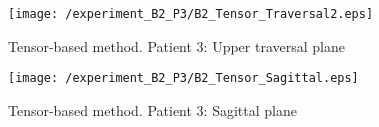 \begin{figure}[H]
  \centering
  \texttt{[image: /experiment\_B2\_P3/B2\_Tensor\_Traversal2.eps]}
  \caption{Tensor-based method. Patient 3: Upper traversal plane}
  \label{B2_TTraversal2}
\end{figure}

\begin{figure}[H]
  \centering
  \texttt{[image: /experiment\_B2\_P3/B2\_Tensor\_Sagittal.eps]}
  \caption{Tensor-based method. Patient 3: Sagittal plane}
  \label{B2_TSagittal}
\end{figure}